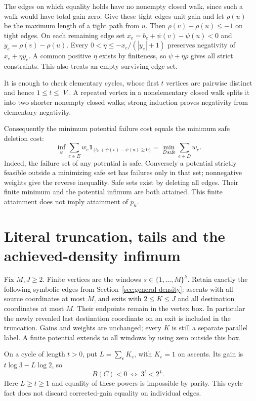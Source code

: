 \documentclass[11pt,letterpaper]{article}
\newcommand{\ind}{\mathbf{1}}
\begin{document}
The edges on which equality holds have no nonempty closed walk, since such
a walk would have total gain zero. Give these tight edges unit gain and let
$\rho(u)$ be the maximum length of a tight path from $u$. Then
$\rho(v)-\rho(u)\le-1$ on tight edges. On each remaining edge set
$x_e=b_e+\psi(v)-\psi(u)<0$ and $y_e=\rho(v)-\rho(u)$. Every
$0<\eta\le-x_e/(|y_e|+1)$ preserves negativity of $x_e+\eta y_e$.
A common positive $\eta$ exists by finiteness, so $\psi+\eta\rho$ gives all
strict constraints. This also treats an empty surviving edge set.

It is enough to check elementary cycles, whose first $t$ vertices are
pairwise distinct and hence $1\le t\le|V|$. A repeated vertex in a
nonelementary closed walk splits it into two shorter nonempty closed walks;
strong induction proves negativity from elementary negativity.

Consequently the minimum potential failure cost equals the minimum safe
deletion cost:
\begin{equation}\label{eq:deletion-optimum}
 \inf_\psi\sum_{e\in E}w_e
 \ind_{\{b_e+\psi(v)-\psi(u)\ge0\}}
 =\min_{D\,\mathrm{safe}}\sum_{e\in D}w_e.
\end{equation}
Indeed, the failure set of any potential is safe. Conversely a potential
strictly feasible outside a minimizing safe set has failures only in that
set; nonnegative weights give the reverse inequality. Safe sets exist by
deleting all edges. Their finite minimum and the potential infimum are both
attained. This finite attainment does not imply attainment of $p_h$.

\section{Literal truncation, tails and the achieved-density infimum}
Fix $M,J\ge2$. Finite vertices are the windows
$s\in\{1,\ldots,M\}^h$. Retain exactly the following symbolic edges from
Section~\ref{sec:general-density}: ascents with all source coordinates at most
$M$, and exits with $2\le K\le J$ and all destination coordinates at most $M$.
Their endpoints remain in the vertex box. In particular the newly revealed
last destination coordinate on an exit is included in the truncation. Gains
and weights are unchanged; every $K$ is still a separate parallel label.
A finite potential extends to all windows by using zero outside this box.

On a cycle of length $t>0$, put $L=\sum_e K_e$, with $K_e=1$ on ascents.
Its gain is $t\log3-L\log2$, so
\[
 B(C)<0\ \Longleftrightarrow\ 3^t<2^L.
\]
Here $L\ge t\ge1$ and equality of these powers is impossible by parity.
This cycle fact does not discard corrected-gain equality on individual edges.
\end{document}
